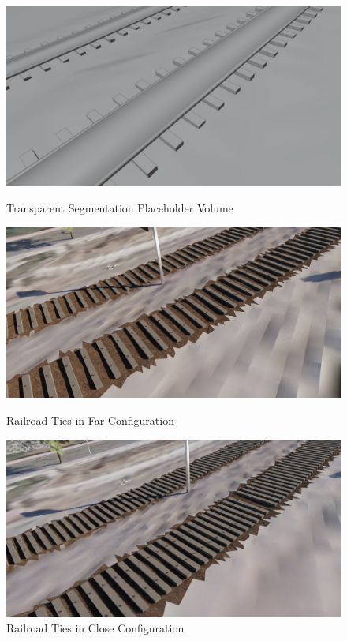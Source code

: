 \begin{figure}[!htb]
   \begin{minipage}{0.3\textwidth}
     \centering
     \includegraphics[width=.97\linewidth]{src/img/procedural-tracks/3c-matte-view.jpg}
     \caption{Transparent Segmentation Placeholder Volume}
     \label{fig:track-transparent-segmentation-placeholder}
   \end{minipage}\hfill
   \begin{minipage}{0.3\textwidth}
     \centering
     \includegraphics[width=\linewidth]{src/img/procedural-tracks/2b-planks-far.jpg}
     \caption{Railroad Ties in Far Configuration}
     \label{fig:wood-far}
   \end{minipage}\hfill
   \begin{minipage}{0.3\textwidth}
     \centering
     \includegraphics[width=.97\linewidth]{src/img/procedural-tracks/2a-planks-bolts-close.jpg}
     \caption{Railroad Ties in Close Configuration}
     \label{fig:wood-close}
   \end{minipage}
\end{figure}


